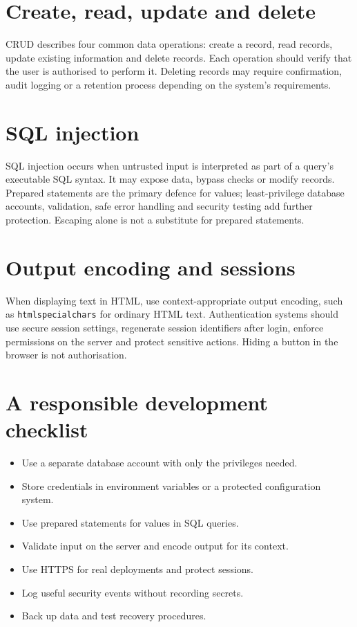 \documentclass[11pt,openany,oneside]{book}
\begin{document}
\section{Create, read, update and delete}
CRUD describes four common data operations: create a record, read records, update existing information and delete records. Each operation should verify that the user is authorised to perform it. Deleting records may require confirmation, audit logging or a retention process depending on the system's requirements.

\section{SQL injection}
SQL injection occurs when untrusted input is interpreted as part of a query's executable SQL syntax. It may expose data, bypass checks or modify records. Prepared statements are the primary defence for values; least-privilege database accounts, validation, safe error handling and security testing add further protection. Escaping alone is not a substitute for prepared statements.

\section{Output encoding and sessions}
When displaying text in HTML, use context-appropriate output encoding, such as \texttt{htmlspecialchars} for ordinary HTML text. Authentication systems should use secure session settings, regenerate session identifiers after login, enforce permissions on the server and protect sensitive actions. Hiding a button in the browser is not authorisation.

\section{A responsible development checklist}
\begin{itemize}
\item Use a separate database account with only the privileges needed.
\item Store credentials in environment variables or a protected configuration system.
\item Use prepared statements for values in SQL queries.
\item Validate input on the server and encode output for its context.
\item Use HTTPS for real deployments and protect sessions.
\item Log useful security events without recording secrets.
\item Back up data and test recovery procedures.
\end{itemize}
\end{document}
